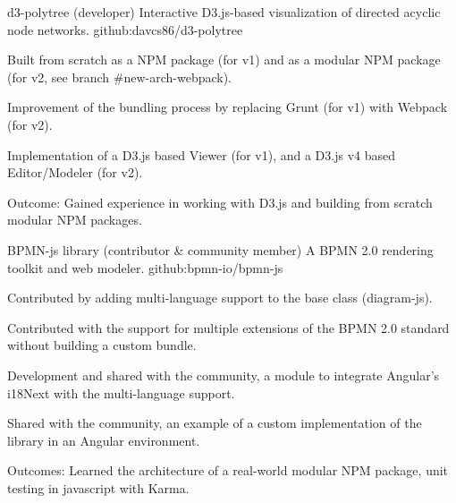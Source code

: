 


\begin{cventries}


\cventry
{d3-polytree (developer)} %
{Interactive D3.js-based visualization of directed acyclic node networks.} %
{ } %
{github:davcs86/d3-polytree} %
{ %
	\begin{cvitems}
		\item {Built from scratch as a NPM package (for v1) and as a modular NPM package (for v2, see branch \#new-arch-webpack).}
		\item {Improvement of the bundling process by replacing Grunt (for v1) with Webpack (for v2).}
		\item {Implementation of a D3.js based Viewer (for v1), and a D3.js v4 based Editor/Modeler (for v2).}
		\item {Outcome: Gained experience in working with D3.js and building from scratch modular NPM packages.}
	\end{cvitems}
}


\cventry
{BPMN-js library (contributor \& community member)} %
{A BPMN 2.0 rendering toolkit and web modeler.} %
{ } %
{github:bpmn-io/bpmn-js} %
{ %
	\begin{cvitems}
		\item {Contributed by adding multi-language support to the base class (diagram-js).}
		\item {Contributed with the support for multiple extensions of the BPMN 2.0 standard without building a custom bundle.}
		\item {Development and shared with the community, a module to integrate Angular's i18Next with the multi-language support.}
		\item {Shared with the community, an example of a custom implementation of the library in an Angular environment.}
		\item {Outcomes: Learned the architecture of a real-world modular NPM package, unit testing in javascript with Karma.}
	\end{cvitems}
}


\end{cventries}
